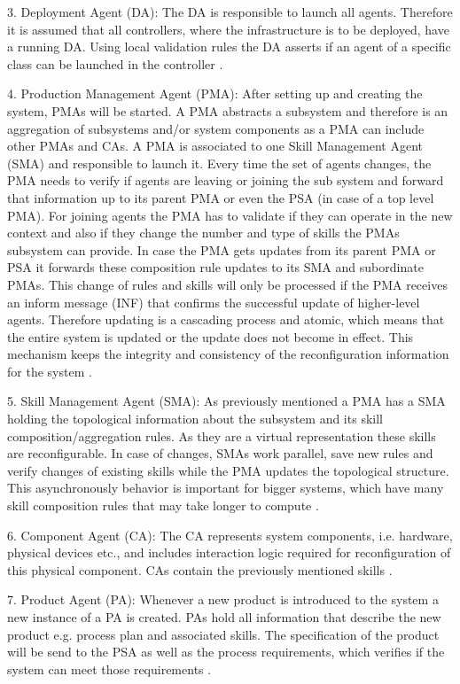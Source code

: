 \documentclass[conference,compsoc,hidelinks]{IEEEtran}
\begin{document}
3. Deployment Agent (DA): The DA is responsible to launch all agents. Therefore it is assumed that all controllers, where the infrastructure is to be deployed, have a running DA. Using local validation rules the DA asserts if an agent of a specific class can be launched in the controller \cite{Hybrid}. 

4. Production Management Agent (PMA): After setting up and creating the system, PMAs will be started. A PMA abstracts a subsystem and therefore is an aggregation of subsystems and/or system components as a PMA can include other PMAs and CAs. A PMA is associated to one Skill Management Agent (SMA) and responsible to launch it. Every time the set of agents changes, the PMA needs to verify if agents are leaving or joining the sub system and forward that information up to its parent PMA or even the PSA (in case of a top level PMA). For joining agents the PMA has to validate if they can operate in the new context and also if they change the number and type of skills the PMAs subsystem can provide. In case the PMA gets updates from its parent PMA or PSA it forwards these composition rule updates to its SMA and subordinate PMAs. This change of rules and skills will only be processed if the PMA receives an inform message (INF) that confirms the successful update of higher-level agents. Therefore updating is a cascading process and atomic, which means that the entire system is updated or the update does not become in effect. This mechanism keeps the integrity and consistency of the reconfiguration information for the system \cite{Hybrid}.

5. Skill Management Agent (SMA): As previously mentioned a PMA has a SMA holding the topological information about the subsystem and its skill composition/aggregation rules. As they are a virtual representation these skills are reconfigurable. In case of changes, SMAs work parallel, save new rules and verify changes of existing skills while the PMA updates the topological structure. This asynchronously behavior is important for bigger systems, which have many skill composition rules that may take longer to compute \cite{Hybrid}.

6. Component Agent (CA): The CA represents system components, i.e. hardware, physical devices etc., and includes interaction logic required for reconfiguration of this physical component. CAs contain the previously mentioned skills \cite{Hybrid}.

7. Product Agent (PA): Whenever a new product is introduced to the system a new instance of a PA is created. PAs hold all information that describe the new product e.g. process plan and associated skills. The specification of the product will be send to the PSA as well as the process requirements, which verifies if the system can meet those requirements \cite{Hybrid}. 
\end{document}
